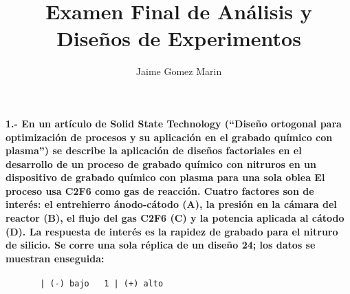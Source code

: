 \documentclass[]{article}
\title{Examen Final de Análisis y Diseños de Experimentos}
\author{Jaime Gomez Marin}
\date{}
\let\oldparagraph\paragraph
\renewcommand{\paragraph}[1]{\oldparagraph{#1}\mbox{}}
\begin{document}
\maketitle

\hypertarget{en-un-articulo-de-solid-state-technology-diseno-ortogonal-para-optimizacion-de-procesos-y-su-aplicacion-en-el-grabado-quimico-con-plasma-se-describe-la-aplicacion-de-disenos-factoriales-en-el-desarrollo-de-un-proceso-de-grabado-quimico-con-nitruros-en-un-dispositivo-de-grabado-quimico-con-plasma-para-una-sola-oblea-el-proceso-usa-c2f6-como-gas-de-reaccion.-cuatro-factores-son-de-interes-el-entrehierro-anodo-catodo-a-la-presion-en-la-camara-del-reactor-b-el-flujo-del-gas-c2f6-c-y-la-potencia-aplicada-al-catodo-d.-la-respuesta-de-interes-es-la-rapidez-de-grabado-para-el-nitruro-de-silicio.-se-corre-una-sola-replica-de-un-diseno-24-los-datos-se-muestran-enseguida}{%
\paragraph{1.- En un artículo de Solid State Technology (``Diseño
ortogonal para optimización de procesos y su aplicación en el grabado
químico con plasma'') se describe la aplicación de diseños factoriales
en el desarrollo de un proceso de grabado químico con nitruros en un
dispositivo de grabado químico con plasma para una sola oblea El proceso
usa C2F6 como gas de reacción. Cuatro factores son de interés: el
entrehierro ánodo-cátodo (A), la presión en la cámara del reactor (B),
el flujo del gas C2F6 (C) y la potencia aplicada al cátodo (D). La
respuesta de interés es la rapidez de grabado para el nitruro de
silicio. Se corre una sola réplica de un diseño 24; los datos se
muestran
enseguida:}\label{en-un-articulo-de-solid-state-technology-diseno-ortogonal-para-optimizacion-de-procesos-y-su-aplicacion-en-el-grabado-quimico-con-plasma-se-describe-la-aplicacion-de-disenos-factoriales-en-el-desarrollo-de-un-proceso-de-grabado-quimico-con-nitruros-en-un-dispositivo-de-grabado-quimico-con-plasma-para-una-sola-oblea-el-proceso-usa-c2f6-como-gas-de-reaccion.-cuatro-factores-son-de-interes-el-entrehierro-anodo-catodo-a-la-presion-en-la-camara-del-reactor-b-el-flujo-del-gas-c2f6-c-y-la-potencia-aplicada-al-catodo-d.-la-respuesta-de-interes-es-la-rapidez-de-grabado-para-el-nitruro-de-silicio.-se-corre-una-sola-replica-de-un-diseno-24-los-datos-se-muestran-enseguida}}

\begin{verbatim}
       | (-) bajo   1 | (+) alto
\end{verbatim}
\end{document}
